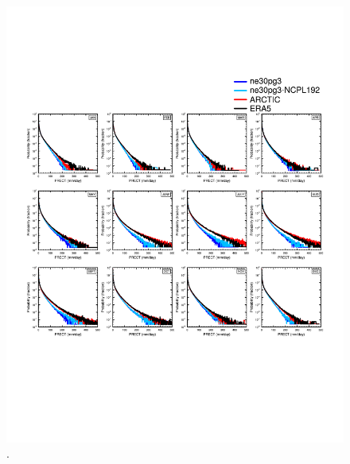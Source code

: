 \documentclass[draft]{agujournal2019}
\begin{document}
\begin{figure}[t]
\begin{center}
         \includegraphics[width=130mm]{figs/temp_composite_ge45N_pdf.pdf}
\end{center}
\caption{.}
\label{fig:comp-pdf}
\end{figure}
\end{document}
